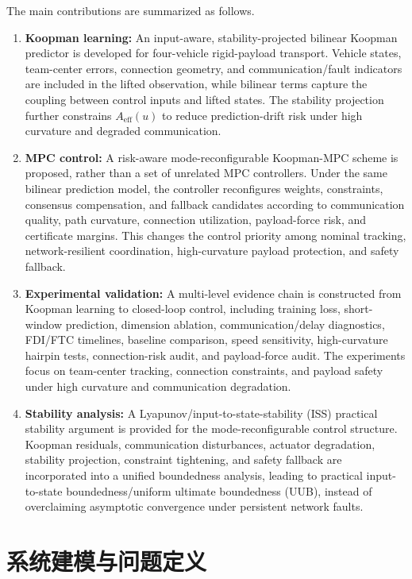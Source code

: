 \documentclass[twocolumn,3p,times,procedia]{elsarticle}
\begin{document}
The main contributions are summarized as follows.
\begin{enumerate}
\item \textbf{Koopman learning:} An input-aware, stability-projected bilinear Koopman predictor is developed for four-vehicle rigid-payload transport. Vehicle states, team-center errors, connection geometry, and communication/fault indicators are included in the lifted observation, while bilinear terms capture the coupling between control inputs and lifted states. The stability projection further constrains $A_{\mathrm{eff}}(u)$ to reduce prediction-drift risk under high curvature and degraded communication.
\item \textbf{MPC control:} A risk-aware mode-reconfigurable Koopman-MPC scheme is proposed, rather than a set of unrelated MPC controllers. Under the same bilinear prediction model, the controller reconfigures weights, constraints, consensus compensation, and fallback candidates according to communication quality, path curvature, connection utilization, payload-force risk, and certificate margins. This changes the control priority among nominal tracking, network-resilient coordination, high-curvature payload protection, and safety fallback.
\item \textbf{Experimental validation:} A multi-level evidence chain is constructed from Koopman learning to closed-loop control, including training loss, short-window prediction, dimension ablation, communication/delay diagnostics, FDI/FTC timelines, baseline comparison, speed sensitivity, high-curvature hairpin tests, connection-risk audit, and payload-force audit. The experiments focus on team-center tracking, connection constraints, and payload safety under high curvature and communication degradation.
\item \textbf{Stability analysis:} A Lyapunov/input-to-state-stability (ISS) practical stability argument is provided for the mode-reconfigurable control structure. Koopman residuals, communication disturbances, actuator degradation, stability projection, constraint tightening, and safety fallback are incorporated into a unified boundedness analysis, leading to practical input-to-state boundedness/uniform ultimate boundedness (UUB), instead of overclaiming asymptotic convergence under persistent network faults.
\end{enumerate}

\section{系统建模与问题定义}
\end{document}
